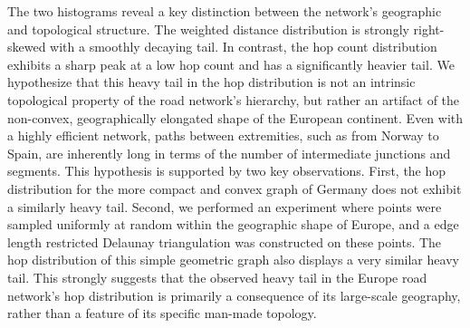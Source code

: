 The two histograms reveal a key distinction between the network's geographic and topological structure.
The weighted distance distribution is strongly right-skewed with a smoothly decaying tail.
In contrast, the hop count distribution exhibits a sharp peak at a low hop count and has a significantly heavier tail.
We hypothesize that this heavy tail in the hop distribution is not an intrinsic topological property of the road network's hierarchy, but rather an artifact of the non-convex, geographically elongated shape of the European continent.
Even with a highly efficient network, paths between extremities, such as from Norway to Spain, are inherently long in terms of the number of intermediate junctions and segments.
This hypothesis is supported by two key observations.
First, the hop distribution for the more compact and convex graph of Germany does not exhibit a similarly heavy tail.
Second, we performed an experiment where points were sampled uniformly at random within the geographic shape of Europe, and a edge length restricted Delaunay triangulation was constructed on these points.
The hop distribution of this simple geometric graph also displays a very similar heavy tail.
This strongly suggests that the observed heavy tail in the Europe road network's hop distribution is primarily a consequence of its large-scale geography, rather than a feature of its specific man-made topology.


